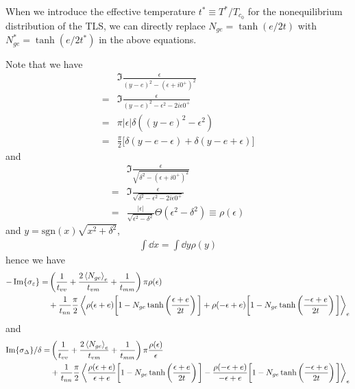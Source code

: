 \documentclass[aps,prl,preprint]{revtex4-2}
\begin{document}
When we introduce the effective temperature $t^* \equiv T^*/T_{c_0}$ for the nonequilibrium distribution of the TLS,
we can directly replace $N_{ge} = \tanh(e/2t)$
with $N_{ge}^* = \tanh(e/2t^*)$ in the above equations.

Note that we have
\begin{align}
      & \Im{ \frac{\epsilon}{ (y-e)^2 - (\epsilon+i0^+)^2} }                  \\
    = & \Im{ \frac{\epsilon}{ (y-e)^2 - \epsilon^2 - 2i\epsilon 0^+ } }       \\
    = & \pi |\epsilon| \delta\left((y-e)^2-\epsilon^2\right)                  \\
    = & \frac{\pi}{2} \bigg[\delta(y-e-\epsilon) + \delta(y-e+\epsilon)\bigg]
\end{align}
and
\begin{align}
      & \Im{\frac{\epsilon}{\sqrt{\delta^2 - (\epsilon+i0^+)^2}}}                                      \\
    = & \Im{\frac{\epsilon}{\sqrt{\delta^2 - \epsilon^2 - 2i\epsilon 0^+}}}                            \\
    = & \frac{|\epsilon|}{\sqrt{\epsilon^2-\delta^2}}\Theta(\epsilon^2-\delta^2) \equiv \rho(\epsilon)
\end{align}
and $y = \text{sgn}(x)\sqrt{x^2+\delta^2}$,
\begin{align}
    \int\dd x = \int\dd y\rho(y)
\end{align}
hence we have
\begin{align}
    -\Im{\sigma_\varepsilon} = & \left(\frac{1}{t_{vv}} + \frac{2\ev{N_{ge}}_e}{t_{vm}} + \frac{1}{t_{mm}}\right)\pi\rho(\epsilon)               \\
                                       & + \frac{1}{t_{nn}}\frac{\pi}{2} \ev{\rho(\epsilon+e)\bigg[1-N_{ge}\tanh\left(\frac{\epsilon+e}{2t}\right)\bigg]
    + \rho(-\epsilon+e)\bigg[1-N_{ge}\tanh\left(\frac{-\epsilon+e}{2t}\right)\bigg]}_e \nonumber
\end{align}
and
\begin{align}
    \Im{\sigma_\Delta}/\delta = & \left(\frac{1}{t_{vv}} + \frac{2\ev{N_{ge}}_e}{t_{vm}} + \frac{1}{t_{mm}}\right)\pi\frac{\rho(\epsilon)}{\epsilon}                 \\
                         & + \frac{1}{t_{nn}}\frac{\pi}{2} \ev{\frac{\rho(\epsilon+e)}{\epsilon+e}\bigg[1-N_{ge}\tanh\left(\frac{\epsilon+e}{2t}\right)\bigg]
    - \frac{\rho(-\epsilon+e)}{-\epsilon+e}\bigg[1-N_{ge}\tanh\left(\frac{-\epsilon+e}{2t}\right)\bigg]}_e \nonumber
\end{align}
\end{document}
